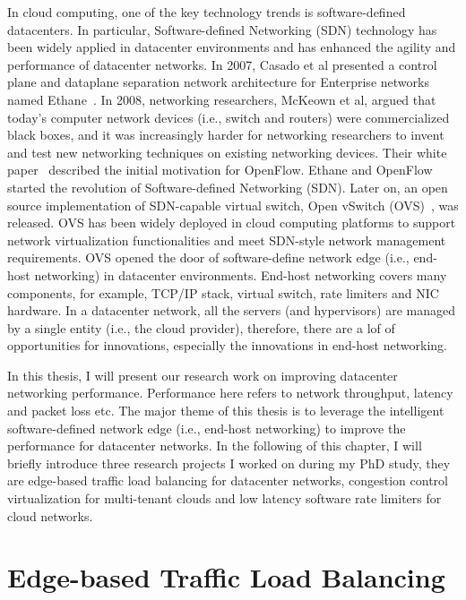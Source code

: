 In cloud computing, one of the key technology trends is software-defined datacenters. 
In particular, Software-defined Networking (SDN) technology has been widely 
applied in datacenter environments and has enhanced the agility and performance of datacenter networks.
In 2007, Casado et al presented a control plane and dataplane separation network architecture for 
Enterprise networks named Ethane~\cite{casado2007ethane}. 
In 2008, networking researchers, McKeown et al, argued that today's computer network 
devices (i.e., switch and routers) were commercialized black boxes, 
and it was increasingly harder for networking researchers to invent and test new networking 
techniques on existing networking devices. Their white paper~\cite{McKeown08} described the initial motivation 
for OpenFlow. Ethane and OpenFlow started the revolution of Software-defined Networking (SDN). 
Later on, an open source implementation of SDN-capable virtual switch, Open vSwitch (OVS)~\cite{Pfaff2015ovs}, was released. 
OVS has been widely deployed in cloud computing platforms to support network virtualization functionalities and 
meet SDN-style network management requirements.
OVS opened the door of software-define network edge (i.e., end-host networking) in datacenter environments.
End-host networking covers many components, for example, TCP/IP stack, virtual switch, rate limiters and NIC hardware. 
In a datacenter network, all the servers (and hypervisors) are managed by a single entity 
(i.e., the cloud provider), therefore, there are a lof of opportunities for innovations, 
especially the innovations in end-host networking.

In this thesis, I will present our research work on improving datacenter networking performance. 
Performance here refers to network throughput, latency and packet loss etc. 
The major theme of this thesis is to leverage the intelligent software-defined network 
edge (i.e., end-host networking) to improve the performance for datacenter networks.
In the following of this chapter, I will briefly introduce three research projects I worked on 
during my PhD study, they are \textemdash\xspace edge-based traffic load balancing for 
datacenter networks, congestion control virtualization for multi-tenant clouds and 
low latency software rate limiters for cloud networks.

\section{Edge-based Traffic Load Balancing}

